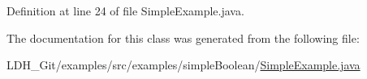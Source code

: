 Definition at line 24 of file Simple\-Example.\-java.



The documentation for this class was generated from the following file\-:\begin{DoxyCompactItemize}
\item 
L\-D\-H\-\_\-\-Git/examples/src/examples/simple\-Boolean/\hyperlink{simple_boolean_2_simple_example_8java}{Simple\-Example.\-java}\end{DoxyCompactItemize}
